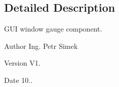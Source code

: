 \subsection{Detailed Description}
G\+UI window gauge component. 

\begin{DoxyAuthor}{Author}
Ing. Petr Simek 
\end{DoxyAuthor}
\begin{DoxyVersion}{Version}
V1. 
\end{DoxyVersion}
\begin{DoxyDate}{Date}
10.. 
\end{DoxyDate}

